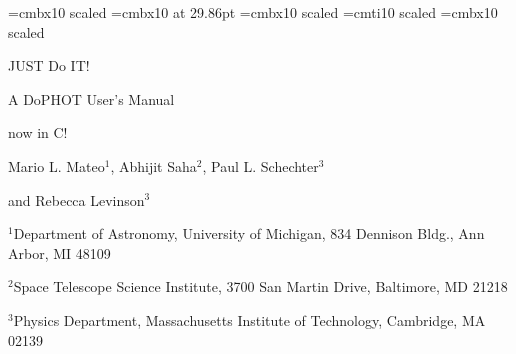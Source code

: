 \font\justdoit=cmbx10 scaled 
\font\justdoneit=cmbx10 at 29.86pt
\font\cookbook=cmbx10 scaled 
\font\cookbookit=cmti10 scaled 
\font\authors=cmbx10 scaled 
\vglue 1in
\centerline{\justdoneit JUST Do IT!}
\vskip 2in
\centerline{\cookbook A DoPHOT User's Manual}
\centerline{\cookbookit now in C!}

\vskip 48pt
\centerline{\authors Mario L. Mateo$^1$, Abhijit Saha$^2$, 
Paul L. Schechter$^3$}
\centerline{\authors and Rebecca Levinson$^3$}

\vskip 0.75in

\item{$^1$}Department of Astronomy, University of Michigan, 834 Dennison Bldg.,
Ann Arbor, MI 48109

\item{$^2$}Space Telescope Science Institute, 3700 San Martin Drive,
Baltimore, MD 21218

\item{$^3$}Physics Department, Massachusetts Institute of Technology,
Cambridge, MA 02139
























